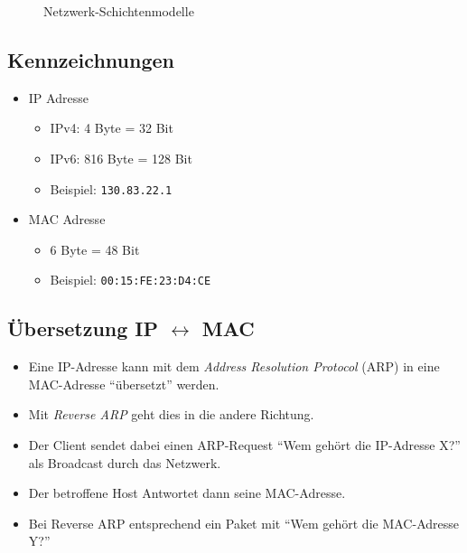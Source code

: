 \documentclass[a4paper, 11pt, accentcolor = tud3b]{tudreport}
\begin{document}
\begin{figure}[H]
                	\caption{Netzwerk-Schichtenmodelle}
                \end{figure}

            \subsection{Kennzeichnungen}
                \begin{itemize}
                	\item IP Adresse
	                	\begin{itemize}
	                		\item IPv4: 4 Byte = 32 Bit
	                		\item IPv6: 816 Byte = 128 Bit
	                		\item Beispiel: \texttt{130.83.22.1}
	                	\end{itemize}
                	\item MAC Adresse
	                	\begin{itemize}
	                		\item 6 Byte = 48 Bit
	                		\item Beispiel: \texttt{00:15:FE:23:D4:CE}
	                	\end{itemize}
                \end{itemize}

            \subsection{Übersetzung IP \(\leftrightarrow\) MAC}
                \begin{itemize}
                	\item Eine IP-Adresse kann mit dem \textit{Address Resolution Protocol} (ARP) in eine MAC-Adresse \enquote{übersetzt} werden.
                	\item Mit \textit{Reverse ARP} geht dies in die andere Richtung.
                	\item Der Client sendet dabei einen ARP-Request \enquote{Wem gehört die IP-Adresse X?} als Broadcast durch das Netzwerk.
                	\item Der betroffene Host Antwortet dann seine MAC-Adresse.
                	\item Bei Reverse ARP entsprechend ein Paket mit \enquote{Wem gehört die MAC-Adresse Y?}
                \end{itemize}
\end{document}
